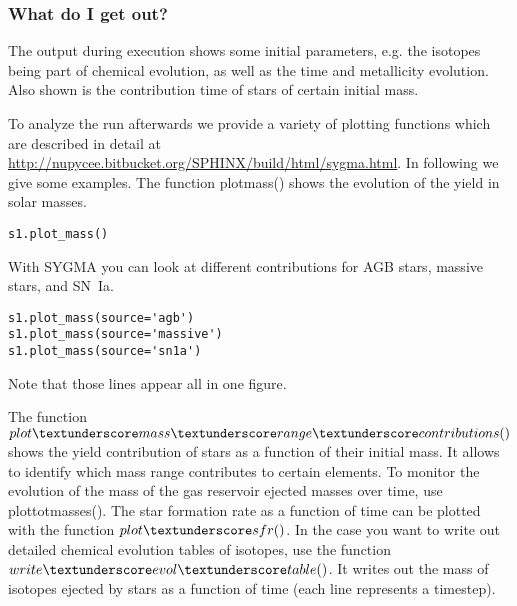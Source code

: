 \subsubsection{What do I get out?}


The output during execution shows some initial parameters,
e.g. the isotopes being part of chemical evolution,
as well as the time and metallicity evolution.
Also shown is the contribution time of stars of 
certain initial mass.




To analyze the run afterwards we provide a variety of plotting  functions
which are described in detail at \url{http://nupycee.bitbucket.org/SPHINX/build/html/sygma.html}.
In following we give some examples. The function plot\textunderscore mass() shows the evolution
of the yield in solar masses.


\begin{verbatim}
s1.plot_mass()
\end{verbatim}

With SYGMA you can look at different contributions
for AGB stars, massive stars, and SN~Ia.

\begin{verbatim}
s1.plot_mass(source='agb')
s1.plot_mass(source='massive')
s1.plot_mass(source='sn1a')

\end{verbatim}

Note that those lines appear all in one figure.

The function $plot\textunderscore mass\textunderscore range\textunderscore contributions()$
shows the yield contribution of stars as a function of their initial mass.
It allows to identify which mass range contributes to certain elements.
To monitor the evolution of the mass of the gas reservoir ejected
masses over time, use plot\textunderscore totmasses().
The star formation rate as a function of time can be plotted with the function $plot\textunderscore sfr()$.
In the case you want to write out detailed chemical evolution tables
of isotopes, use the function $write\textunderscore evol\textunderscore table()$.
It writes out the mass of isotopes ejected by stars as a function of time
(each line represents a timestep).


